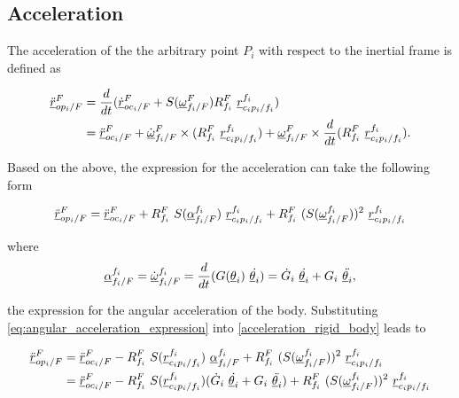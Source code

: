 \subsection{Acceleration}

The acceleration of the the arbitrary point $P_{i}$ with respect to the inertial frame 
is defined as
    
\begin{align*}
    \pvec{\ddot{r}}{op_{i}}{F}{F} 
    & = \frac{d}{dt}( \pvec{\dot{r}}{oc_{i}}{F}{F} + 
    S(\pvec{\omega}{f_{i}}{F}{F}) \rot{R}{f_{i}}{F} \ \pvec{r}{c_{i}p_{i}}{f_i}{f_i}) \\
    & = \pvec{\ddot{r}}{oc_{i}}{F}{F} +  \pvec{\dot{\omega}}{f_{i}}{F}{F} \times 
    (\rot{R}{f_{i}}{F} \  \pvec{r}{c_{i}p_{i}}{f_i}{f_i}) + 
    \pvec{\omega}{f_{i}}{F}{F} \times 
    \frac{d}{dt}(\rot{R}{f_{i}}{F} \  \pvec{r}{c_{i}p_{i}}{f_i}{f_i}).
\end{align*}

Based on the above, the expression for the acceleration can take the 
following form 
    

\begin{equation}
    \pvec{\ddot{r}}{op_{i}}{F}{F} = \pvec{\ddot{r}}{oc_{i}}{F}{F} +
    \rot{R}{f_{i}}{F} \ S(\pvec{\alpha}{f_{i}}{F}{f_i}) \ \pvec{r}{c_{i}p_{i}}{f_i}{f_i}
    + \rot{R}{f_{i}}{F} \ (S(\pvec{\omega}{f_{i}}{F}{f_i}))^{2} \ \pvec{r}{c_{i}p_{i}}{f_i}{f_i}
    \label{acceleration_rigid_body}
\end{equation}

where 
\begin{equation}
    \pvec{\alpha}{f_{i}}{F}{f_i} = \pvec{\dot{\omega}}{f_{i}}{F}{f_i} = 
    \frac{d}{dt}(G(\vecd{\theta}_{i}) \ \dot{\vecd{\theta}_{i}}) = 
    \dot{G}_{i} \ \dot{\vecd{\theta}_{i}} + 
    G_{i} \ \ddot{\vecd{\theta}_{i}},
    \label{eq:angular_acceleration_expression}
\end{equation}

the expression for the angular acceleration of the body. Substituting 
\eqref{eq:angular_acceleration_expression} into \eqref{acceleration_rigid_body}
leads to 

\begin{align*}
   \pvec{\ddot{r}}{op_{i}}{F}{F} 
   & =  \pvec{\ddot{r}}{oc_{i}}{F}{F} - \rot{R}{f_{i}}{F} \ S(\pvec{r}{c_{i}p_{i}}{f_i}{f_i}) \ \pvec{\alpha}{f_{i}}{F}{f_i}
    + \rot{R}{f_{i}}{F} \ (S(\pvec{\omega}{f_{i}}{F}{f_i}))^{2} \ \pvec{r}{c_{i}p_{i}}{f_i}{f_i} \\ 
    & = \pvec{\ddot{r}}{oc_{i}}{F}{F} - \rot{R}{f_{i}}{F} \ S(\pvec{r}{c_{i}p_{i}}{f_i}{f_i}) (\dot{G}_{i} \ \dot{\vecd{\theta}_{i}} + 
    G_{i} \ \ddot{\vecd{\theta}_{i}}) + \rot{R}{f_{i}}{F} \ (S(\pvec{\omega}{f_{i}}{F}{f_i}))^{2} \ \pvec{r}{c_{i}p_{i}}{f_i}{f_i} 
\end{align*}


